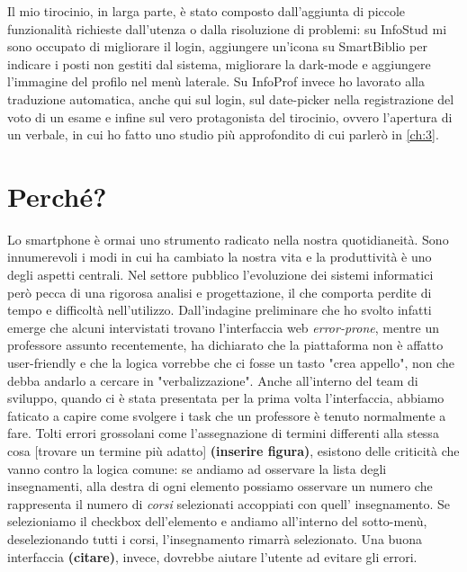 \documentclass[Lau, oneside]{sapthesis}%
\begin{document}
Il mio tirocinio, in larga parte, è stato composto dall'aggiunta di piccole funzionalità richieste dall'utenza o dalla risoluzione di 
problemi: su InfoStud mi sono occupato di migliorare il login, aggiungere un'icona su SmartBiblio per indicare i posti non gestiti
dal sistema, migliorare la dark-mode e aggiungere l'immagine del profilo nel menù laterale. Su InfoProf invece ho lavorato alla
traduzione automatica, anche qui sul login, sul date-picker nella registrazione del voto di un esame e infine sul vero protagonista del 
tirocinio, ovvero l'apertura di un verbale, in cui ho fatto uno studio più approfondito di cui parlerò in \ref{ch:3}.

\section{Perché?}
\label{sec:why}
Lo smartphone è ormai uno strumento radicato nella nostra quotidianeità. Sono innumerevoli i modi in cui ha cambiato la nostra vita e la
produttività è uno degli aspetti centrali. Nel settore pubblico l'evoluzione dei sistemi informatici però pecca di una rigorosa analisi 
e progettazione, il che comporta perdite di tempo e difficoltà nell'utilizzo.
Dall'indagine preliminare che ho svolto infatti emerge che alcuni intervistati trovano l'interfaccia web \textit{error-prone}, mentre 
un professore assunto recentemente, ha dichiarato che la piattaforma non è affatto user-friendly e che la logica vorrebbe che ci fosse
un tasto "crea appello", non che debba andarlo a cercare in "verbalizzazione". Anche all'interno del team di sviluppo, quando ci è
stata presentata per la prima volta l'interfaccia, abbiamo faticato a capire come svolgere i task che un professore è tenuto normalmente
a fare. Tolti errori grossolani come l'assegnazione di termini differenti alla stessa cosa [trovare un termine più adatto] 
\textbf{(inserire figura)}, esistono delle criticità che vanno contro la logica comune: se andiamo ad osservare la lista degli insegnamenti,
alla destra di ogni elemento possiamo osservare un numero che rappresenta il numero di \textit{corsi} selezionati accoppiati con quell'
insegnamento. Se selezioniamo il checkbox dell'elemento e andiamo all'interno del sotto-menù, deselezionando tutti i corsi, l'insegnamento
rimarrà selezionato. Una buona interfaccia \textbf{(citare)}, invece, dovrebbe aiutare l'utente ad evitare gli errori.

\end{document}
